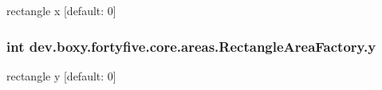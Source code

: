 \label{db/d94/group___rectangle_area_gae77066a4844139558dd4e05beb887764}
rectangle x \mbox{[}default: 0\mbox{]} \hypertarget{group___rectangle_area_ga40b3b0422d96ddc0c318efaeff239cc5}{
\subsubsection[{y}]{\setlength{\rightskip}{0pt plus 5cm}int {\bf dev.boxy.fortyfive.core.areas.RectangleAreaFactory.y}}}
\label{db/d94/group___rectangle_area_ga40b3b0422d96ddc0c318efaeff239cc5}
rectangle y \mbox{[}default: 0\mbox{]} 